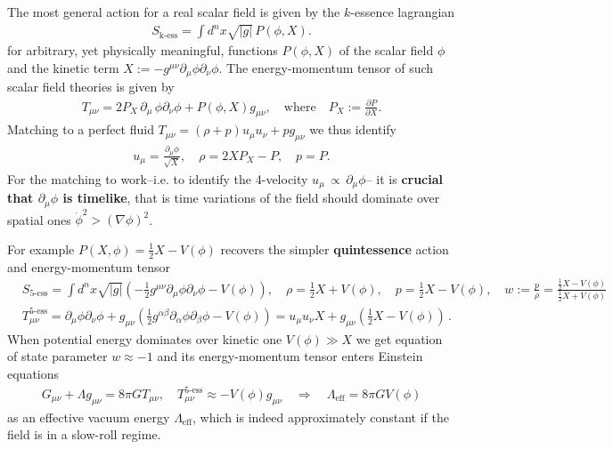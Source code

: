 \begin{mytheorem}
%
The most general action for a real scalar field is given by the $k$-essence lagrangian 
\begin{align}
    S_{\text{k-ess}} = \int \!\!d^nx \sqrt{|g|} \,P(\phi,X).
\end{align}
for arbitrary, yet physically meaningful, functions $P(\phi,X)$ of the scalar field $\phi$ and the kinetic term $X:=-g^{\mu\nu} \partial_\mu \phi \partial_\nu \phi$.
The energy-momentum tensor of such scalar field theories is given by
\begin{align}
    T_{\mu\nu} = 2P_{X} \,\partial_\mu \,\phi \partial_\nu \phi +  P(\phi,X) g_{\mu\nu},\quad \text{where}\quad P_X := \frac{\partial P}{\partial X}.
\end{align}
Matching to a perfect fluid $T_{\mu\nu}=(\rho + p) u_\mu u_\nu + p g_{\mu\nu}$ we thus identify
\begin{align}
    u_{\mu}= \frac{\partial_\mu \phi}{\sqrt{X}},\quad \rho = 2X P_X - P,\quad p = P.
\end{align}
For the matching to work--i.e. to identify the 4-velocity $u_\mu \,\propto \,\partial_\mu \phi$-- it is \textbf{crucial that $\partial_\mu \phi$ is timelike}, that is time variations of the field should dominate over spatial ones $\dot{\phi}^2 > (\nabla \phi)^2$.

For example $P(X,\phi)=\tfrac{1}{2}X-V(\phi)$ recovers the simpler \textbf{quintessence} action and energy-momentum tensor
{\small
\begin{align}
    &S_{\text{5-ess}}=\int\!\! d^nx \sqrt{|g|} \left( -\frac{1}{2} g^{\mu\nu} \partial_\mu \phi \partial_\nu \phi - V(\phi) \right),\quad
    \rho = \tfrac{1}{2} X + V(\phi),\quad p = \tfrac{1}{2} X - V(\phi), \quad w:= \frac{p}{\rho} = \frac{\tfrac{1}{2}X - V(\phi)}{\tfrac{1}{2}X + V(\phi)}\\[4pt]
    &T^{\text{5-ess}}_{\mu\nu} = \partial_\mu \phi \partial_\nu \phi + g_{\mu\nu}\left( \tfrac{1}{2} g^{\alpha\beta} \partial_\alpha \phi \partial_\beta \phi  - V(\phi) \right) = u_\mu u_\nu X + g_{\mu\nu} \left( \tfrac{1}{2} X - V(\phi) \right)\,.
\end{align}
}
When potential energy dominates over kinetic one $V(\phi) \gg X$ we get equation of state parameter $w\approx -1$ and its energy-momentum tensor enters Einstein equations 
\begin{align}
    G_{\mu\nu} + \Lambda g_{\mu\nu} = 8\pi G T_{\mu\nu}, \quad T^{\text{5-ess}}_{\mu\nu} \approx - V(\phi) g_{\mu\nu} \quad \Rightarrow \quad \Lambda_\text{eff} = 8\pi G V(\phi)
\end{align}
as an effective vacuum energy $\Lambda_{\text{eff}}$, which is indeed approximately constant if the field is in a slow-roll regime.
%
\end{mytheorem}

